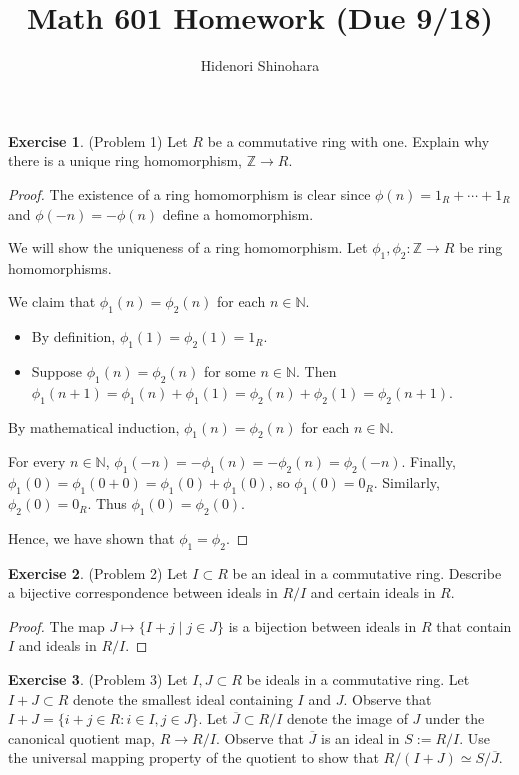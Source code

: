 \documentclass[12pt, psamsfonts]{amsart}
\theoremstyle{definition}
\newtheorem*{exer}{Exercise}
\theoremstyle{remark}
\numberwithin{equation}{section}
\begin{document}
\title{Math 601 Homework (Due 9/18)}
\author{Hidenori Shinohara}
\maketitle

\begin{exer}{(Problem 1)}
  Let $R$ be a commutative ring with one.
  Explain why there is a unique ring homomorphism, $\mathbb{Z} \rightarrow R$.
\end{exer}

\begin{proof}
  The existence of a ring homomorphism is clear since $\phi(n) = 1_R + \cdots + 1_R$ and $\phi(-n) = -\phi(n)$ define a homomorphism.

  We will show the uniqueness of a ring homomorphism.
  Let $\phi_1, \phi_2: \mathbb{Z} \rightarrow R$ be ring homomorphisms.

  We claim that $\phi_1(n) = \phi_2(n)$ for each $n \in \mathbb{N}$.
  \begin{itemize}
    \item
      By definition, $\phi_1(1) = \phi_2(1) = 1_R$.
    \item
      Suppose $\phi_1(n) = \phi_2(n)$ for some $n \in \mathbb{N}$.
      Then $\phi_1(n + 1) = \phi_1(n) + \phi_1(1) = \phi_2(n) + \phi_2(1) = \phi_2(n + 1)$.
  \end{itemize}
  By mathematical induction, $\phi_1(n) = \phi_2(n)$ for each $n \in \mathbb{N}$.

  For every $n \in \mathbb{N}$, $\phi_1(-n) = -\phi_1(n) = -\phi_2(n) = \phi_2(-n)$.
  Finally, $\phi_1(0) = \phi_1(0 + 0) = \phi_1(0) + \phi_1(0)$, so $\phi_1(0) = 0_R$.
  Similarly, $\phi_2(0) = 0_R$.
  Thus $\phi_1(0) = \phi_2(0)$.

  Hence, we have shown that $\phi_1 = \phi_2$.
\end{proof}

\begin{exer}{(Problem 2)}
  Let $I \subset R$ be an ideal in a commutative ring.
  Describe a bijective correspondence between ideals in $R / I$ and certain ideals in $R$.
\end{exer}

\begin{proof}
  The map $J \mapsto \{ I + j \mid j \in J \}$ is a bijection between ideals in $R$ that contain $I$ and ideals in $R / I$.
\end{proof}

\begin{exer}{(Problem 3)}
  Let $I, J \subset R$ be ideals in a commutative ring.
  Let $I + J \subset R$ denote the smallest ideal containing $I$ and $J$.
  Observe that $I + J = \{ i + j \in R : i \in I, j \in J \}$.
  Let $\overline{J} \subset R / I$ denote the image of $J$ under the canonical quotient map, $R \rightarrow R / I$.
  Observe that $\overline{J}$ is an ideal in $S := R / I$.
  Use the universal mapping property of the quotient to show that $R / (I + J) \simeq S / \overline{J}$.
\end{exer}
\end{document}
